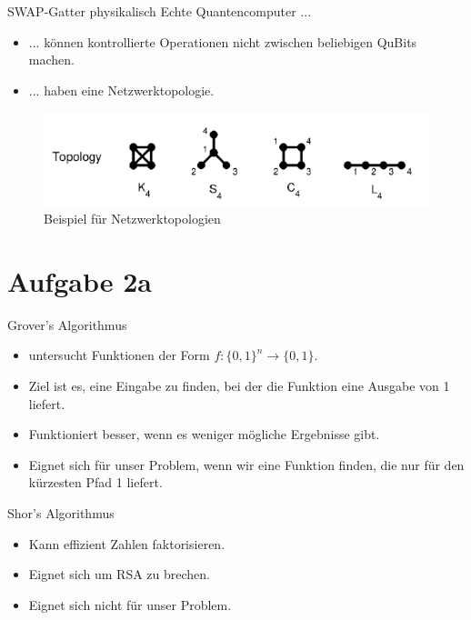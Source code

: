 \documentclass[fleqn,compress,utf8,aspectratio=169,t]{beamer}
\begin{document}
\begin{frame}{SWAP-Gatter physikalisch}
Echte Quantencomputer ...
\begin{itemize}
	\item ... können kontrollierte Operationen nicht zwischen beliebigen QuBits machen.
	\item ... haben eine Netzwerktopologie.
\end{itemize}
\begin{figure}
	\centering
	\includegraphics[height=.3\textheight]{images/1d-topologie.png}
	\caption{Beispiel für Netzwerktopologien}
\end{figure}
\end{frame}

\section{Aufgabe 2a}

\begin{frame}{Grover's Algorithmus}
\begin{itemize}
	\item untersucht Funktionen der Form $f: \{0, 1\}^n \rightarrow \{0, 1\}$.
	\item Ziel ist es, eine Eingabe zu finden, bei der die Funktion eine Ausgabe von 1 liefert.
	\item Funktioniert besser, wenn es weniger mögliche Ergebnisse gibt.
	\item Eignet sich für unser Problem, wenn wir eine Funktion finden, die nur für den kürzesten Pfad 1 liefert.
\end{itemize}	
\end{frame}

\begin{frame}{Shor's Algorithmus}
\begin{itemize}
	\item Kann effizient Zahlen faktorisieren.
	\item Eignet sich um RSA zu brechen.
	\item Eignet sich nicht für unser Problem.
\end{itemize}
\end{frame}
\end{document}
